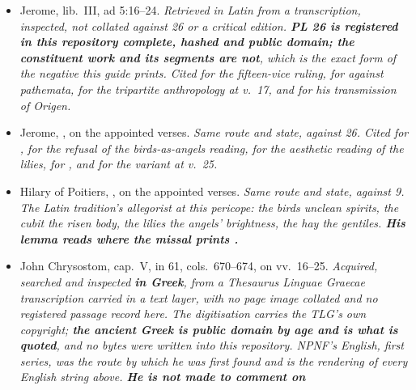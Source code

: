 \begin{itemize}[leftmargin=1.2em, itemsep=0.15em]
on the appointed pericope. \textit{Retrieved in Latin from a transcription,
inspected, not collated against  35 or a critical
edition. \textbf{His lemma differs from the missal's at every load-bearing
point} --- thirteen vices, nine fruits, and  at the
exclusion --- so his opposition of the two lists is reported in the canonical
edition as his reading of his own text.}
\item Jerome,  lib.~III, ad
5:16--24. \textit{Retrieved in Latin from a transcription, inspected, not
collated against  26 or a critical edition. \textbf{PL
26 is registered in this repository complete, hashed and public domain; the
constituent work and its segments are not}, which is the exact form of the
negative this guide prints. Cited for the fifteen-vice ruling, for
 against \emph{pathemata}, for the tripartite anthropology at
v.~17, and for his transmission of Origen.}
\item Jerome, , on the appointed verses.
\textit{Same route and state, against  26. Cited for
, for the refusal
of the birds-as-angels reading, for the aesthetic reading of the lilies, for
, and for the variant 
at v.~25.}
\item Hilary of Poitiers, , on the appointed
verses. \textit{Same route and state, against  9. The
Latin tradition's allegorist at this pericope: the birds unclean spirits, the
cubit the risen body, the lilies the angels' brightness, the hay the gentiles.
\textbf{His lemma reads  where the missal prints
.}}
\item John Chrysostom,  cap.~V, in
 61, cols.~670--674, on vv.~16--25. \textit{Acquired,
searched and inspected \textbf{in Greek}, from a Thesaurus Linguae Graecae
transcription carried in a text layer, with no  page
image collated and no registered passage record here. The digitisation carries
the TLG's own copyright; \textbf{the ancient Greek is public domain by age and
is what is quoted}, and no bytes were written into this repository. NPNF's
English, first series, was the route by which he was first found and is the
rendering of every English string above. \textbf{He is not made to comment on
}}
\end{itemize}
